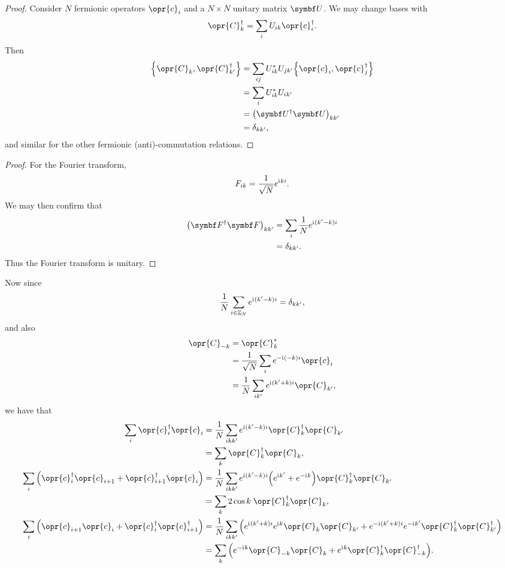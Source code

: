 \documentclass[../thesis.tex]{subfiles}
\begin{document}
\begin{proof}
  Consider $N$ fermionic operators $\opr{c}_i$ and a $N \times N$ unitary matrix
  $\mq{U}$. We may change bases with
  \begin{equation}
    \opr{C}_k^\dag
    = \sum_i U_{ik} \opr{c}_i^\dag.
  \end{equation}
  Then
  \begin{align}
    \acomm{\opr{C}_k}{\opr{C}_{k'}^\dag}
    &= \sum_{ij} U_{ik}^*U_{jk'} \acomm{\opr{c}_i}{\opr{c}_j^\dag} \\
    &= \sum_i U_{ik}^*U_{ik'} \\
    &= {\qty(\mq{U}^\dag\mq{U})}_{kk'} \\
    &= \delta_{kk'},
  \end{align}
  and similar for the other fermionic (anti)-commutation relations.
\end{proof}
\begin{proof}
  For the Fourier transform,
  \begin{equation}
    F_{ik}
    = \frac{1}{\sqrt{N}} e^{\mathrm{i}\mkern1mu ki}.
  \end{equation}
  We may then confirm that
  \begin{align}
    {\qty(\mq{F}^\dag\mq{F})}_{kk'}
    &= \sum_i \frac{1}{N} e^{\im (k' - k)i} \\
    &= \delta_{kk'}.
  \end{align}
  Thus the Fourier transform is unitary.
\end{proof}
Now since
\begin{equation}
  \frac{1}{N}\sum_{i\in\mathbb{Z}_N} e^{\mathrm{i}\mkern1mu(k' - k) i}
  = \delta_{kk'},
\end{equation}
and also
\begin{align}
  \opr{C}_{-k}
  &= \opr{C}_k^* \\
  &= \frac{1}{\sqrt{N}} \sum_i e^{-\im (-k)i} \opr{c}_i \\
  &= \frac{1}{N}\sum_{ik'} e^{\im (k' + k)i} \opr{C}_{k'},
\end{align}
we have that
\begin{align}
  \sum_i \opr{c}_i^\dag\opr{c}_i
  &= \frac{1}{N}\sum_{ikk'} e^{\im (k' - k)i}
  \opr{C}_k^\dag \opr{C}_{k'} \\
  &= \sum_k \opr{C}_k^\dag \opr{C}_k,
  \\
  \sum_i \qty(\opr{c}_i^\dag\opr{c}_{i+1} + \opr{c}_{i+1}^\dag\opr{c}_i)
  &= \frac{1}{N}\sum_{ikk'} e^{\im (k' - k)i} \qty(%
  e^{\im k'} + e^{-\im k} 
  ) \opr{C}_k^\dag \opr{C}_{k'} \\
  &= \sum_k 2 \cos k\; \opr{C}_k^\dag \opr{C}_k,
  \\
  \sum_i \qty(\opr{c}_{i+1}\opr{c}_i + \opr{c}_i^\dag\opr{c}_{i+1}^\dag)
  &= \frac{1}{N}\sum_{ikk'} \qty(%
  e^{\im (k' + k)i} e^{\im k} \opr{C}_{k}\opr{C}_{k'}
  + e^{-\im (k' + k)i} e^{-\im k'} \opr{C}_{k}^\dag\opr{C}_{k'}^\dag
  ) \\
  &= \sum_k \qty(%
  e^{-\im k} \opr{C}_{-k} \opr{C}_k
  + e^{\im k} \opr{C}_k^\dag \opr{C}_{-k}^\dag
  ).
\end{align}
\end{document}
